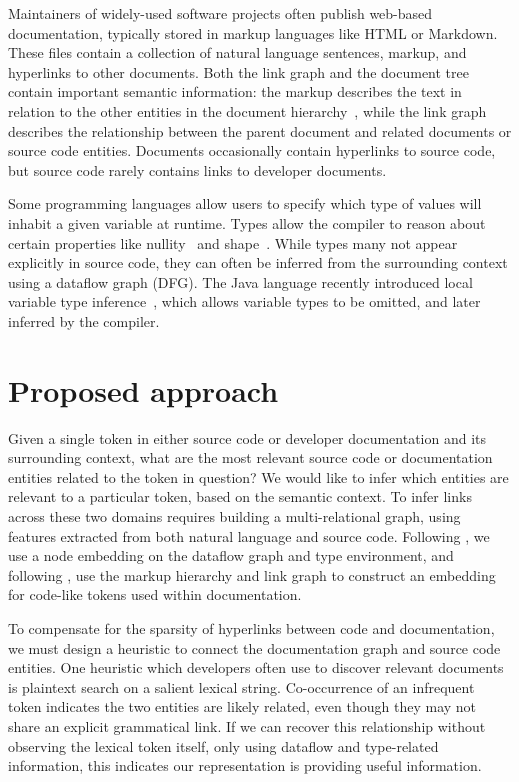 \documentclass{article}
\begin{document}
Maintainers of widely-used software projects often publish web-based documentation, typically stored in markup languages like HTML or Markdown. These files contain a collection of natural language sentences, markup, and hyperlinks to other documents. Both the link graph and the document tree contain important semantic information: the markup describes the text in relation to the other entities in the document hierarchy~\citep{yang2016hierarchical}, while the link graph describes the relationship between the parent document and related documents or source code entities. Documents occasionally contain hyperlinks to source code, but source code rarely contains links to developer documents.

Some programming languages allow users to specify which type of values will inhabit a given variable at runtime. Types allow the compiler to reason about certain properties like nullity~\citep{ekman2007pluggable} and shape~\citep{considine2019kotlingrad}. While types many not appear explicitly in source code, they can often be inferred from the surrounding context using a dataflow graph (DFG). The Java language recently introduced local variable type inference~\citet{liddell2019analyzing}, which allows variable types to be omitted, and later inferred by the compiler.

\section{Proposed approach}

Given a single token in either source code or developer documentation and its surrounding context, what are the most relevant source code or documentation entities related to the token in question? We would like to infer which entities are relevant to a particular token, based on the semantic context. To infer links across these two domains requires building a multi-relational graph, using features extracted from both natural language and source code. Following \citet{si2018learning, gu2018deep, 10.1145/3361242.3362774}, we use a node embedding on the dataflow graph and type environment, and following \citet{yang2016hierarchical, zhang2018link}, use the markup hierarchy and link graph to construct an embedding for code-like tokens used within documentation.

To compensate for the sparsity of hyperlinks between code and documentation, we must design a heuristic to connect the documentation graph and source code entities. One heuristic which developers often use to discover relevant documents is plaintext search on a salient lexical string. Co-occurrence of an infrequent token indicates the two entities are likely related, even though they may not share an explicit grammatical link. If we can recover this relationship without observing the lexical token itself, only using dataflow and type-related information, this indicates our representation is providing useful information.
\end{document}
